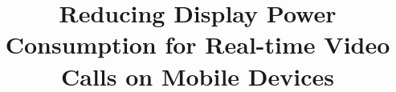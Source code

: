 \documentclass[conference]{IEEEtran}
\begin{document}
\title{Reducing Display Power Consumption for Real-time Video Calls on Mobile Devices}






\author{}

\maketitle




















{
 \begin{footnotesize}
   
 \end{footnotesize}
}


%


\end{document}
